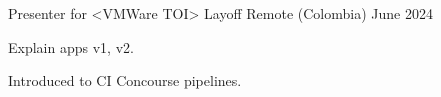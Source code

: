 

\begin{cventries}

  \cventry
    {Presenter for <VMWare TOI>} %
    {Layoff} %
    {Remote (Colombia)} %
    {June 2024} %
    {
      \begin{cvitems} %
        \item {Explain apps v1, v2.}
        \item {Introduced to CI Concourse pipelines.}
      \end{cvitems}
    }

\end{cventries}
